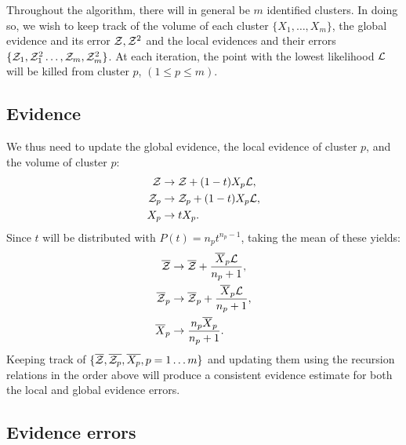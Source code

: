 Throughout the algorithm, there will in general be $m$ identified clusters. In doing so, we wish to keep track of the volume of each cluster $\{X_1,\ldots,X_m\}$, the global evidence and its error $\mathcal{Z},\mathcal{Z}^2$ and the local evidences and their errors $\{\mathcal{Z}_1,\mathcal{Z}_1^2\ldots,\mathcal{Z}_m,\mathcal{Z}_m^2\}$. At each iteration, the point with the lowest likelihood $\mathcal{L}$ will be killed from cluster $p$, ${(1\le p\le m)}$. 


\subsection{Evidence}
\label{sec:ens:cluster_ev}

We thus need to update the global evidence, the local evidence of cluster $p$, and the volume of cluster $p$:
%
\begin{align}
  \mathcal{Z} &\to \mathcal{Z} + (1-t)X_p\mathcal{L},
  \label{eqn:ens:rr_ev}\\
  \mathcal{Z}_p &\to \mathcal{Z}_p + (1-t)X_p\mathcal{L},
  \label{eqn:ens:rr_evi}\\
  X_p &\to t X_p.
  \label{eqn:ens:rr_Xi}
\end{align}
%
Since $t$ will be distributed with $P(t) = n_p t^{n_p-1}$,
taking the mean of these yields:
%
\begin{align}
  \overline{\mathcal{Z}} &\to \overline{\mathcal{Z}} + \frac{\overline X_p \mathcal{L}}{n_p+1},\\
  \overline{\mathcal{Z}}_p &\to \overline{\mathcal{Z}}_p + \frac{\overline X_p \mathcal{L}}{n_p+1},\\
  \overline X_p &\to \frac{n_p\overline X_p }{n_p+1}. 
\end{align}
%
Keeping track of $\{\overline{\mathcal{Z}},\overline{\mathcal{Z}_p},\overline{X_p},p=1\ldots m\}$ and updating them using the recursion relations in the order above will produce a consistent evidence estimate for both the local and global evidence errors.


\subsection{Evidence errors}
\label{sec:ens:cluster_err}


